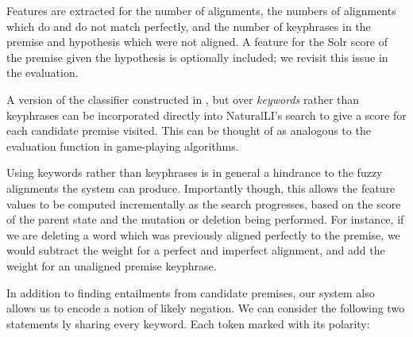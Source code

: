 Features are extracted for the number of alignments, the numbers of alignments
  which do and do not match perfectly, 
  and the number of keyphrases in the premise and hypothesis
  which were not aligned.
A feature for the Solr score of the premise given the hypothesis is optionally
  included; we revisit this issue in the evaluation.

%
%
A version of the classifier constructed in 
  , but over \textit{keywords} rather
  than keyphrases can be incorporated directly into
  NaturalLI's search to give a score for each candidate premise visited.
This can be thought of as analogous to the evaluation function in game-playing
  algorithms.


Using keywords rather than keyphrases is in general a hindrance to the
  fuzzy alignments the system can produce.
Importantly though, this allows the feature values to be computed 
  incrementally as the search
  progresses, based on the score of the parent state and the mutation or
  deletion being performed.
For instance, if we are deleting a word which was previously aligned perfectly
  to the premise, we would subtract the weight for a perfect and imperfect
  alignment, and add the weight for an unaligned premise keyphrase.

In addition to finding entailments from candidate premises, our system also
  allows us to encode a notion of likely negation.
We can consider the following two statements \naive ly sharing every keyword.
Each token marked with its polarity:

